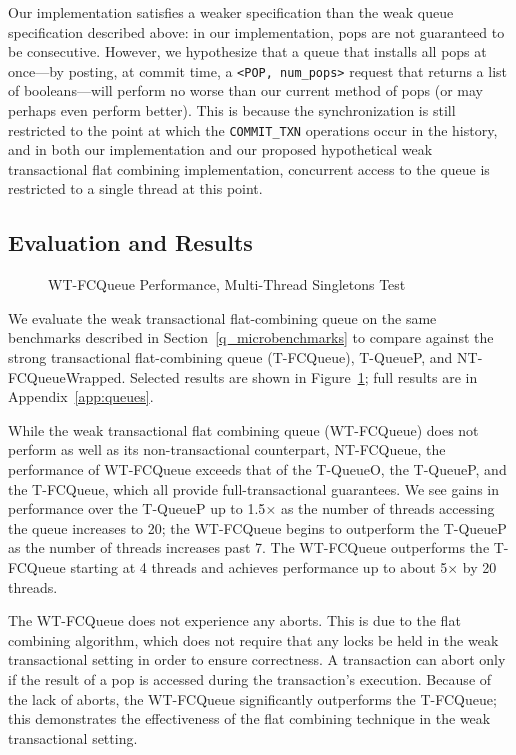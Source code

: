 Our implementation satisfies a weaker specification than the weak queue specification described above: in our implementation, pops are not guaranteed to be consecutive. However, we hypothesize that a queue that installs all pops at once---by posting, at commit time, a \texttt{<POP, num\_pops>} request that returns a list of booleans---will perform no worse than our current method of pops (or may perhaps even perform better). This is because the synchronization is still restricted to the point at which the \texttt{COMMIT\_TXN} operations occur in the history, and in both our implementation and our proposed hypothetical weak transactional flat combining implementation, concurrent access to the queue is restricted to a single thread at this point.

\subsection{Evaluation and Results}

\begin{figure}[t]
    \centering
    \caption{WT-FCQueue Performance, Multi-Thread Singletons Test}
    \label{fig:wtqs}
\end{figure}

We evaluate the weak transactional flat-combining queue on the same benchmarks described in Section~\ref{q_microbenchmarks} to compare against the strong transactional flat-combining queue (T-FCQueue), T-QueueP, and NT-FCQueueWrapped. Selected results are shown in Figure~\ref{fig:wtqs}; full results are in Appendix~\ref{app:queues}. 

While the weak transactional flat combining queue (WT-FCQueue) does not perform as well as its non-transactional counterpart, NT-FCQueue, the performance of WT-FCQueue exceeds that of the T-QueueO, the T-QueueP, and the T-FCQueue, which all provide full-transactional guarantees. We see gains in performance over the T-QueueP up to 1.5$\times$ as the number of threads accessing the queue increases to 20; the WT-FCQueue begins to outperform the T-QueueP as the number of threads increases past 7. The WT-FCQueue outperforms the T-FCQueue starting at 4 threads and achieves performance up to about 5$\times$ by 20 threads.
 
The WT-FCQueue does not experience any aborts. This is due to the flat combining algorithm, which does not require that any locks be held in the weak transactional setting in order to ensure correctness. A transaction can abort only if the result of a pop is accessed during the transaction's execution.
Because of the lack of aborts, the WT-FCQueue significantly outperforms the T-FCQueue; this demonstrates the effectiveness of the flat combining technique in the weak transactional setting. 

